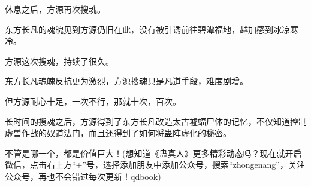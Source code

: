 \begin{this_body}
休息之后，方源再次搜魂。

东方长凡的魂魄见到方源仍旧在此，没有被引诱前往碧潭福地，越加感到冰凉寒冷。

方源这次搜魂，持续了很久。

东方长凡魂魄反抗更为激烈，方源搜魂只是凡道手段，难度剧增。

但方源耐心十足，一次不行，那就十次，百次。

长时间的搜魂之后，方源得到了东方长凡改造太古墟蝠尸体的记忆，不仅知道控制虚兽作战的奴道法门，而且还得到了如何将蛊阵虚化的秘密。

不管是哪一个，都是价值巨大！(想知道《蛊真人》更多精彩动态吗？现在就开启微信，点击右上方“+”号，选择添加朋友中添加公众号，搜索“zhongenang”，关注公众号，再也不会错过每次更新！qdbook)

\end{this_body}

